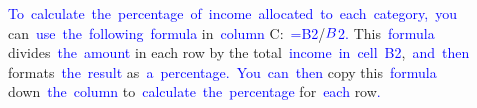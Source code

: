 \documentclass{article}
\begin{document}
\begin{tcolorbox}[colframe=black,colback=white]
{}\textcolor{blue}{To}\textcolor{blue}{~calculate}\textcolor{blue}{~the}\textcolor{blue}{~percentage}\textcolor{blue}{~of}\textcolor{blue}{~income}\textcolor{blue}{~allocated}\textcolor{blue}{~to}\textcolor{blue}{~each}\textcolor{blue}{~category}\textcolor{blue}{,}\textcolor{blue}{~you} can\textcolor{blue}{~use}\textcolor{blue}{~the}\textcolor{blue}{~following}\textcolor{blue}{~formula} in\textcolor{blue}{~column} C:\textcolor{blue}{~=}\textcolor{blue}{B}\textcolor{blue}{2}/$\textcolor{blue}{B}$\textcolor{blue}{2}\textcolor{blue}{.} This\textcolor{blue}{~formula} divides\textcolor{blue}{~the}\textcolor{blue}{~amount} in each row by the total\textcolor{blue}{~income}\textcolor{blue}{~in}\textcolor{blue}{~cell}\textcolor{blue}{~B}\textcolor{blue}{2},\textcolor{blue}{~and}\textcolor{blue}{~then} formats\textcolor{blue}{~the}\textcolor{blue}{~result} as\textcolor{blue}{~a}\textcolor{blue}{~percentage}\textcolor{blue}{.}\textcolor{blue}{~You}\textcolor{blue}{~can}\textcolor{blue}{~then} copy this\textcolor{blue}{~formula} down\textcolor{blue}{~the}\textcolor{blue}{~column} to\textcolor{blue}{~calculate}\textcolor{blue}{~the}\textcolor{blue}{~percentage} for\textcolor{blue}{~each} row\textcolor{blue}{.}\textcolor{blue}{}
\end{tcolorbox}
\end{document}
